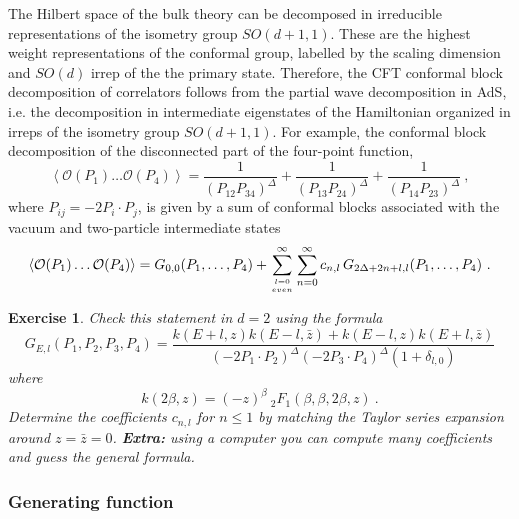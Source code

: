 \documentclass{ws-rv9x6}
\newtheorem{exercise}{Exercise}[section]
\newcommand\be{\begin{equation}}
\newcommand\ee{\end{equation}}
\begin{document}
The Hilbert space of the bulk theory can be decomposed in irreducible
representations of the isometry group $SO(d+1,1)$. These are the
highest weight representations of the conformal group, labelled by
the scaling dimension and $SO(d)$ irrep of the the primary state.
Therefore, the CFT conformal block decomposition of correlators follows
from the partial wave decomposition in AdS, i.e. the decomposition
in intermediate eigenstates of the Hamiltonian organized in irreps
of the isometry group $SO(d+1,1)$. For example, the conformal block
decomposition of the disconnected part of the four-point function,
\be
\left\langle \mathcal{O}(P_{1})\dots\mathcal{O}(P_{4})\right\rangle =
\frac{1}{\left( P_{12}  P_{34}\right)^{\Delta} }+
\frac{1}{\left( P_{13}  P_{24}\right)^{\Delta} }+
\frac{1}{\left( P_{14}  P_{23}\right)^{\Delta} } \ ,
\ee
where $P_{ij} =-2P_i \cdot P_j$,
 is given by a sum of conformal blocks associated with the vacuum
and two-particle intermediate states 
\be
\left\langle \mathcal{O}(P_{1})\dots\mathcal{O}(P_{4})\right\rangle =G_{0,0}(P_{1},\dots,P_{4})+\sum_{{l=0\atop even}}^{\infty}\sum_{n=0}^{\infty}c_{n,l}\, G_{2\Delta+2n+l,l}(P_{1},\dots,P_{4})\ .
\nonumber
\ee
\begin{exercise} 
Check this statement in $d=2$ using the formula
\cite{hep-th/0011040}
\be
G_{E,l}(P_{1},P_{2},P_{3},P_{4})=\frac{k(E+l,z)k(E-l,\bar{z})+k(E-l,z)k(E+l,\bar{z})}{\left(-2P_{1}\cdot P_{2}\right)^{\Delta}\left(-2P_{3}\cdot P_{4}\right)^{\Delta}\left(1+\delta_{l,0}\right)}
\ee
where 
\be
k(2\beta,z)=(-z)^{\beta}\ _{2}F_{1}(\beta,\beta,2\beta,z)\ .
\ee
Determine the coefficients $c_{n,l}$ for $n\le 1$ by matching the Taylor series expansion around $z=\bar{z}=0$. {\bf Extra:} using a computer you can compute many coefficients and guess the general formula.
\end{exercise} 




\subsubsection{Generating function}
\end{document}
